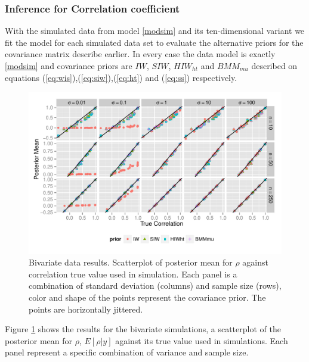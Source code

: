 \documentclass[a4paper]{article}
\newcommand{\matt}[1]{\textcolor{red}{(matt: #1)}}
\begin{document}
\subsubsection{Inference for Correlation coefficient}

With the simulated data from model \eqref{modsim} and its ten-dimensional variant we fit the model for each simulated data set to evaluate the alternative priors for the covariance matrix describe earlier.  In every case the data model is exactly \eqref{modsim} and covariance priors are $IW$, $SIW$, $HIW_{ht}$ and $BMM_{mu}$ described on equations (\ref{eq:wis}),(\ref{eq:siw}),(\ref{eq:ht}) and (\ref{eq:ss}) respectively.   
\begin{figure}[hbtp]
   \centering
   \includegraphics[width=\textwidth] {fig_rho_d2} 
    \vspace{-.5in}
   \caption{Bivariate data results. Scatterplot of posterior mean for $\rho$  against correlation true value used in simulation. Each panel is a combination of standard deviation (columns) and sample size (rows),  color and shape of the points represent the covariance prior. The points are horizontally jittered. \label{rhod2}%
}
\end{figure}

Figure \ref{rhod2} shows the results for the bivariate simulations, a scatterplot of the posterior mean for $\rho$, $E[\rho\vert y]$ against its true value used in simulations.  Each panel represent a specific combination of variance and sample size.  
\end{document}
